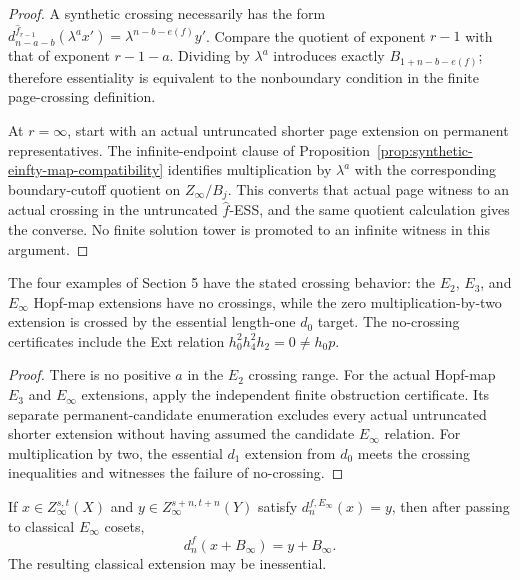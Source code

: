 \begin{proof}
  A synthetic crossing necessarily has the form
  $d_{n-a-b}^{\widehat f_{r-1}}(\lambda^ax')
   =\lambda^{n-b-e(f)}y'$.  Compare the quotient of exponent $r-1$ with that
  of exponent $r-1-a$.  Dividing by $\lambda^a$ introduces exactly
  $B_{1+n-b-e(f)}$; therefore essentiality is equivalent to the nonboundary
  condition in the finite page-crossing definition.

  At $r=\infty$, start with an actual untruncated shorter page extension on
  permanent representatives.  The infinite-endpoint clause of
  Proposition~\ref{prop:synthetic-einfty-map-compatibility} identifies
  multiplication by $\lambda^a$ with the corresponding boundary-cutoff
  quotient on $Z_\infty/B_j$.  This converts that actual page witness to an
  actual crossing in the untruncated $\widehat f$-ESS, and the same quotient
  calculation gives the converse.  No finite solution tower is promoted to an
  infinite witness in this argument.
\end{proof}

\begin{proposition}
  \label{prop:page-crossing-regression}
  \notready
  The four examples of Section 5 have the stated crossing behavior: the
  $E_2$, $E_3$, and $E_\infty$ Hopf-map extensions have no crossings, while
  the zero multiplication-by-two extension is crossed by the essential
  length-one $d_0$ target.  The no-crossing certificates include the Ext
  relation $h_0^2h_4^2h_2=0\ne h_0p$.
\end{proposition}

\begin{proof}
  There is no positive $a$ in the $E_2$ crossing range.  For the actual
  Hopf-map $E_3$ and $E_\infty$ extensions, apply the independent finite
  obstruction certificate.  Its separate permanent-candidate enumeration
  excludes every actual untruncated shorter extension without having assumed
  the candidate $E_\infty$ relation.  For multiplication by two, the essential
  $d_1$ extension from $d_0$ meets the crossing inequalities and witnesses the
  failure of no-crossing.
\end{proof}

\begin{proposition}
  \label{prop:einfty-page-to-classical-extension}
  \notready
  If $x\in Z_\infty^{s,t}(X)$ and
  $y\in Z_\infty^{s+n,t+n}(Y)$ satisfy
  $d_n^{f,E_\infty}(x)=y$, then after passing to classical $E_\infty$ cosets,
  \[
    d_n^f(x+B_\infty)=y+B_\infty.
  \]
  The resulting classical extension may be inessential.
\end{proposition}

